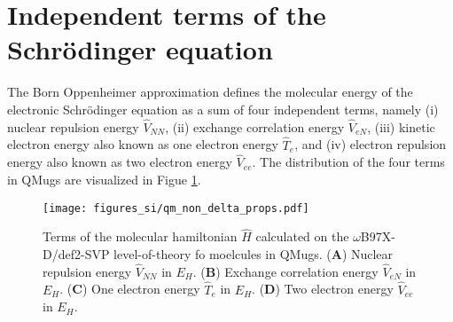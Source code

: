 \newpage
\section{Independent terms of the Schrödinger equation}
The Born Oppenheimer approximation \cite{born1927quantentheorie} defines the molecular energy of the electronic Schrödinger equation as a sum of four independent terms, namely (i) nuclear repulsion energy $\hat{V}_{NN}$, (ii) exchange correlation energy $\hat{V}_{eN}$, (iii) kinetic electron energy also known as one electron energy $\hat{T}_{e}$, and (iv) electron repulsion energy also known as two electron energy $\hat{V}_{ee}$. The distribution of the four terms in QMugs are visualized in Figue \ref{fig:qm_se}.

\begin{figure}[H]
\centering
\texttt{[image: figures\_si/qm\_non\_delta\_props.pdf]}
\caption{Terms of the molecular hamiltonian $\hat{H}$ calculated on the $\omega$B97X-D/def2-SVP level-of-theory fo moelcules in QMugs. (\textbf{A}) Nuclear repulsion energy $\hat{V}_{NN}$ in $E_{H}$. (\textbf{B}) Exchange correlation energy $\hat{V}_{eN}$ in $E_{H}$. (\textbf{C}) One electron energy $\hat{T}_{e}$ in $E_{H}$. (\textbf{D}) Two electron energy $\hat{V}_{ee}$ in $E_{H}$. 
}
\label{fig:qm_se}
\end{figure}

